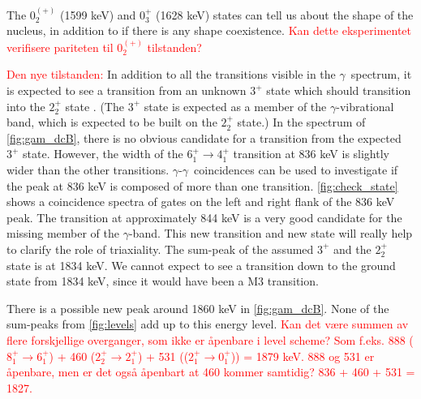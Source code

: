 \documentclass[twoside,english]{uiofysmaster/uiofysmaster}
\newcommand{\ga}{$\gamma$}
\let\orgautoref\autoref
\renewcommand{\autoref}
        {%
		 \def\sectionautorefname{Section}%
		 \def\subsectionautorefname{Section}%
		 \def\subsubsectionautorefname{Section}%
		 \def\chapterautorefname{Chapter}%
          \orgautoref}
\begin{document}
The $0_2^{(+)}$ (1599 keV) and $0_3^{+}$ (1628 keV) states can tell us about the shape of the nucleus, in addition to if there is any shape coexistence. 
\textcolor{red}{Kan dette eksperimentet verifisere pariteten til $0_2^{(+)}$ tilstanden?}

\textcolor{red}{Den nye tilstanden:}\newline
In addition to all the transitions visible in the \ga\ spectrum, it is expected to see a transition from an unknown $3^+$ state which should transition into the $2_2^+$ state \cite{Klintefjord2016, Samorajczyk2015}.
(The $3^+$ state is expected as a member of the \ga-vibrational band, which is expected to be built on the $2_2^+$ state.)
In the spectrum of \autoref{fig:gam_dcB}, there is no obvious candidate for a transition from the expected $3^+$ state.
However, the width of the $6_1^+ \rightarrow 4_1^+$ transition at 836 keV is slightly wider than the other transitions. 
\ga-\ga\ coincidences can be used to investigate if the peak at 836 keV is composed of more than one transition. 
\autoref{fig:check_state} shows a coincidence spectra of gates on the left and right flank of the 836 keV peak.
The transition at approximately 844 keV is a very good candidate for the missing member of the \ga-band. 
This new transition and new state will really help to clarify the role of triaxiality.
The sum-peak of the assumed $3^+$ and the $2_2^+$ state is at 1834 keV. 
We cannot expect to see a transition down to the ground state from 1834 keV, since it would have been a M3 transition. 

There is a possible new peak around 1860 keV in \autoref{fig:gam_dcB}. 
None of the sum-peaks from \autoref{fig:levels} add up to this energy level. 
\textcolor{red}{Kan det være summen av flere forskjellige overganger, som ikke er åpenbare i level scheme? Som f.eks. 888 ($8_1^+ \rightarrow 6_1^+$) + 460 ($2_2^+ \rightarrow 2_1^+$) + 531 (($2_1^+ \rightarrow 0_1^+$)) = 1879 keV. 888 og 531 er åpenbare, men er det også åpenbart at 460 kommer samtidig? 836 + 460 + 531 = 1827.}
\end{document}
